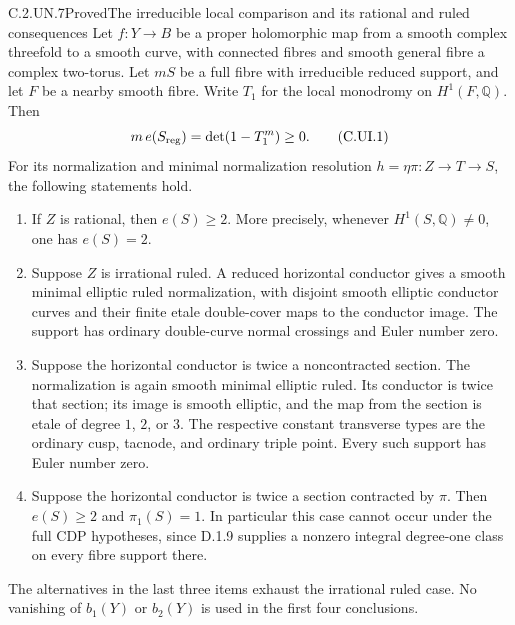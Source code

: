 \begin{statement}{C.2.UN.7}{Proved}{The irreducible local comparison and its rational and ruled consequences}
Let $f:Y\to B$ be a proper holomorphic map from a smooth
complex threefold to a smooth curve, with connected fibres
and smooth general fibre a complex two-torus. Let $mS$ be a full
fibre with irreducible reduced support, and let $F$ be a nearby
smooth fibre. Write $T_1$ for the local monodromy on
$H^1(F,\mathbb Q)$. Then
\[
 m\,e(S_{\rm reg})=\det(1-T_1^m)\ge0.
 \tag{C.UI.1}
\]
For its normalization and minimal normalization resolution
$h=\eta\pi:Z\to T\to S$, the following statements hold.

\begin{enumerate}
\item If $Z$ is rational, then $e(S)\ge2$. More precisely,
      whenever $H^1(S,\mathbb Q)\ne0$, one has $e(S)=2$.
\item Suppose $Z$ is irrational ruled. A reduced horizontal
      conductor gives a smooth minimal elliptic ruled
      normalization, with disjoint smooth elliptic conductor
      curves and their finite etale double-cover maps to the
      conductor image. The support has ordinary double-curve
      normal crossings and Euler number zero.
\item Suppose the horizontal conductor is twice a noncontracted
      section. The normalization is again smooth minimal
      elliptic ruled. Its conductor is twice that section;
      its image is smooth elliptic, and the map from the
      section is etale of degree $1$, $2$, or $3$.
      The respective constant transverse types are the
      ordinary cusp, tacnode, and ordinary triple point.
      Every such support has Euler number zero.
\item Suppose the horizontal conductor is twice a section
      contracted by $\pi$. Then $e(S)\ge2$ and
      $\pi_1(S)=1$. In particular this case cannot occur
      under the full CDP hypotheses, since D.1.9 supplies
      a nonzero integral degree-one class on every fibre
      support there.
\end{enumerate}
The alternatives in the last three items exhaust the
irrational ruled case. No vanishing of $b_1(Y)$ or $b_2(Y)$
is used in the first four conclusions.
\end{statement}
